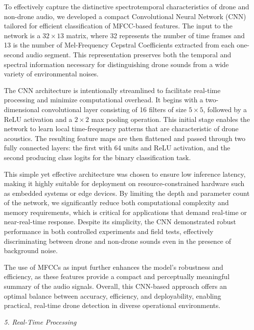 \documentclass[12pt]{article}
\begin{document}
{\fontsize{9}{11}\selectfont
To effectively capture the distinctive spectrotemporal characteristics of drone and non-drone audio, we developed a compact Convolutional Neural Network (CNN) tailored for efficient classification of MFCC-based features. The input to the network is a $32 \times 13$ matrix, where 32 represents the number of time frames and 13 is the number of Mel-Frequency Cepstral Coefficients extracted from each one-second audio segment. This representation preserves both the temporal and spectral information necessary for distinguishing drone sounds from a wide variety of environmental noises.

The CNN architecture is intentionally streamlined to facilitate real-time processing and minimize computational overhead. It begins with a two-dimensional convolutional layer consisting of 16 filters of size $5 \times 5$, followed by a ReLU activation and a $2 \times 2$ max pooling operation. This initial stage enables the network to learn local time-frequency patterns that are characteristic of drone acoustics. The resulting feature maps are then flattened and passed through two fully connected layers: the first with 64 units and ReLU activation, and the second producing class logits for the binary classification task.

This simple yet effective architecture was chosen to ensure low inference latency, making it highly suitable for deployment on resource-constrained hardware such as embedded systems or edge devices. By limiting the depth and parameter count of the network, we significantly reduce both computational complexity and memory requirements, which is critical for applications that demand real-time or near-real-time response. Despite its simplicity, the CNN demonstrated robust performance in both controlled experiments and field tests, effectively discriminating between drone and non-drone sounds even in the presence of background noise.

The use of MFCCs as input further enhances the model’s robustness and efficiency, as these features provide a compact and perceptually meaningful summary of the audio signals. Overall, this CNN-based approach offers an optimal balance between accuracy, efficiency, and deployability, enabling practical, real-time drone detection in diverse operational environments.

}

\begin{center}
{\fontsize{9}{11}\selectfont\textit{5. Real-Time Processing}}
\end{center}
\end{document}

